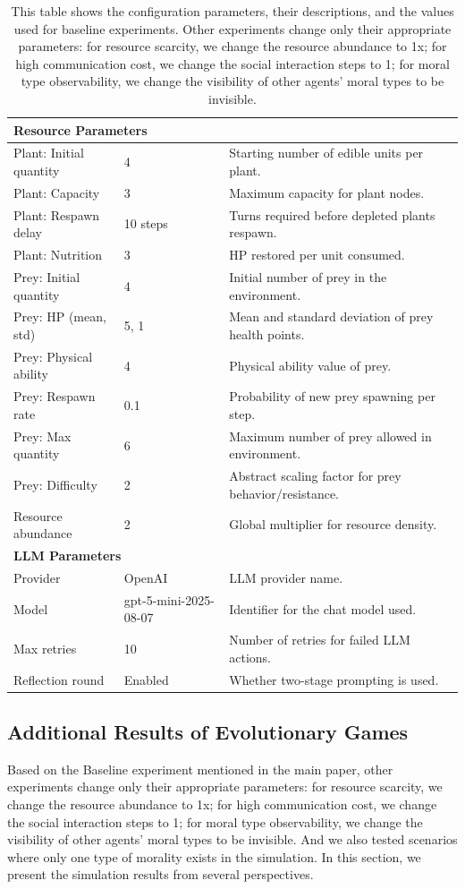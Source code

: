 \begin{table}[htbp]
\begin{tabular}{lp{1.2cm}p{6.5cm}}
\hline
\multicolumn{3}{l}{\textbf{Resource Parameters}} \\
\hline
Plant: Initial quantity & 4 & Starting number of edible units per plant. \\
Plant: Capacity & 3 & Maximum capacity for plant nodes. \\
Plant: Respawn delay & 10 steps & Turns required before depleted plants respawn. \\
Plant: Nutrition & 3 & HP restored per unit consumed. \\
Prey: Initial quantity & 4 & Initial number of prey in the environment. \\
Prey: HP (mean, std) & 5, 1 & Mean and standard deviation of prey health points. \\
Prey: Physical ability & 4 & Physical ability value of prey. \\
Prey: Respawn rate & 0.1 & Probability of new prey spawning per step. \\
Prey: Max quantity & 6 & Maximum number of prey allowed in environment. \\
Prey: Difficulty & 2 & Abstract scaling factor for prey behavior/resistance. \\
Resource abundance & 2 & Global multiplier for resource density. \\
\hline
\multicolumn{3}{l}{\textbf{LLM Parameters}} \\
\hline
Provider & OpenAI & LLM provider name. \\
Model & gpt-5-mini-2025-08-07 & Identifier for the chat model used. \\
Max retries & 10 & Number of retries for failed LLM actions. \\
Reflection round & Enabled & Whether two-stage prompting is used. \\
\hline
\end{tabular}
\caption{This table shows the configuration parameters, their descriptions, and the values used for baseline experiments. Other experiments change only their appropriate parameters: for resource scarcity, we change the resource abundance to 1x; for high communication cost, we change the social interaction steps to 1; for moral type observability, we change the visibility of other agents' moral types to be invisible.}
\label{tab:baseline_config}
\end{table}


\subsection{Additional Results of Evolutionary Games}
Based on the Baseline experiment mentioned in the main paper, other experiments change only their appropriate parameters: for resource scarcity, we change the resource abundance to 1x; for high communication cost, we change the social interaction steps to 1; for moral type observability, we change the visibility of other agents' moral types to be invisible. And we also tested scenarios where only one type of morality exists in the simulation.
In this section, we present the simulation results from several perspectives.

